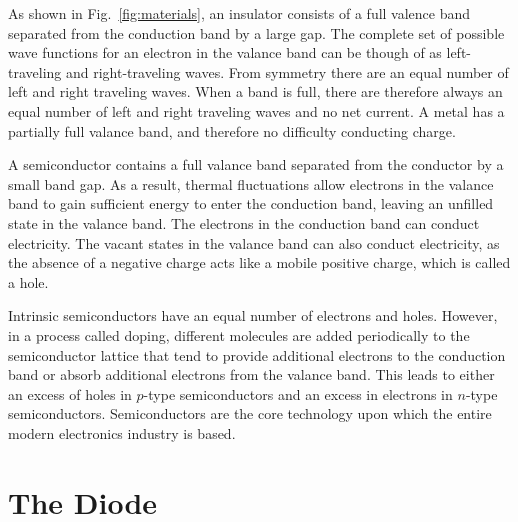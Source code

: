 As shown in Fig.~\ref{fig:materials}, an insulator consists of a full valence band separated from the conduction band by a large gap.  The complete set of possible wave functions for an electron in the valance band can be though of as left-traveling and right-traveling waves.  From symmetry there are an equal number of left and right traveling waves.  When a band is full, there are therefore always an equal number of left and right traveling waves and no net current.  A metal has a partially full valance band, and therefore no difficulty conducting charge.

A semiconductor contains a full valance band separated from the conductor by a small band gap.  As a result, thermal fluctuations allow electrons in the valance band to gain sufficient energy to enter the conduction band, leaving an unfilled state in the valance band.  The electrons in the conduction band can conduct electricity.  The vacant states in the valance band can also conduct electricity, as the absence of a negative charge acts like a mobile positive charge, which is called a hole.

Intrinsic semiconductors have an equal number of electrons and holes.  However, in a process called doping, different molecules are added periodically to the semiconductor lattice that tend to provide additional electrons to the conduction band or absorb additional electrons from the valance band.  This leads to either an excess of holes in $p$-type semiconductors and an excess in electrons in $n$-type semiconductors.  Semiconductors are the core technology upon which the entire modern electronics industry is based.

\section{The Diode}

